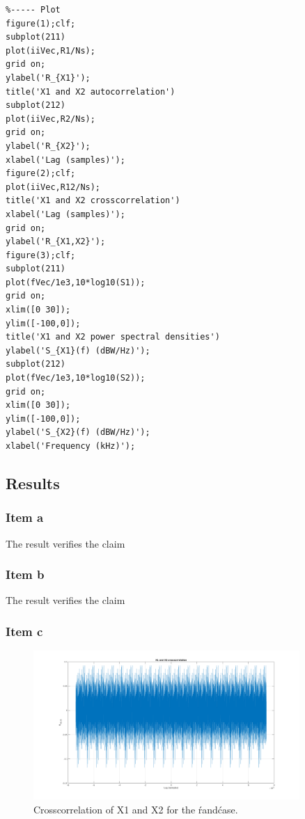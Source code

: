 \begin{lstlisting}
%----- Plot
figure(1);clf;
subplot(211)
plot(iiVec,R1/Ns);
grid on;
ylabel('R_{X1}');
title('X1 and X2 autocorrelation')
subplot(212)
plot(iiVec,R2/Ns);
grid on;
ylabel('R_{X2}');
xlabel('Lag (samples)');
figure(2);clf;
plot(iiVec,R12/Ns);
title('X1 and X2 crosscorrelation')
xlabel('Lag (samples)');
grid on;
ylabel('R_{X1,X2}');
figure(3);clf;
subplot(211)
plot(fVec/1e3,10*log10(S1));
grid on;
xlim([0 30]);
ylim([-100,0]);
title('X1 and X2 power spectral densities')
ylabel('S_{X1}(f) (dBW/Hz)');
subplot(212)
plot(fVec/1e3,10*log10(S2));
grid on;
xlim([0 30]);
ylim([-100,0]);
ylabel('S_{X2}(f) (dBW/Hz)');
xlabel('Frequency (kHz)');
\end{lstlisting}


\subsection{Results}

\subsubsection{Item a}

The result verifies the claim

\subsubsection{Item b}

The result verifies the claim

\subsubsection{Item c}

\begin{figure}[H]
	\centering
	\includegraphics[width=0.9\textwidth]{figs/ex8_crosscorr_rand.png}
	\caption{Crosscorrelation of X1 and X2 for the \'rand\' case.}
	\label{fig:ex8_crosscorr_rand}
\end{figure}

